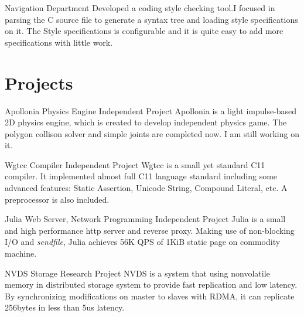 \documentclass[11pt,a4paper]{moderncv}
\begin{document}
{Navigation Department}
{}{}{
	Developed a coding style checking tool.I focused in parsing the C source file to generate a
	syntax tree and loading style specifications on it. The Style specifications is configurable
	and it is quite easy to add more specifications with little work.
}

\section{Projects}

{Apollonia}
{Physics Engine}
{Independent Project}{}{
	Apollonia is a light impulse-based 2D physics engine, which is created to develop independent physics game. The polygon collison solver and simple joints are completed now. I am still working on it.
}

{Wgtcc}
{Compiler}
{Independent Project}{}{
	Wgtcc is a small yet standard C11 compiler. It implemented almost full C11 language standard including some advanced features: Static Assertion, Unicode String, Compound Literal, etc. A preprocessor is also included. 
}

{Julia}
{Web Server, Network Programming}
{Independent Project}{}{
	Julia is a small and high performance http server and reverse proxy. Making use of non-blocking I/O and \textit{sendfile}, Julia achieves 56K QPS of 1KiB static page on commodity machine.
}

{NVDS}
{Storage}
{Research Project}{}{
	NVDS is a system that using nonvolatile memory in distributed storage system to provide fast replication and low latency. By synchronizing modifications on master to slaves with RDMA, it can replicate 256bytes in less than 5us latency.
}





\clearpage
\end{document}
